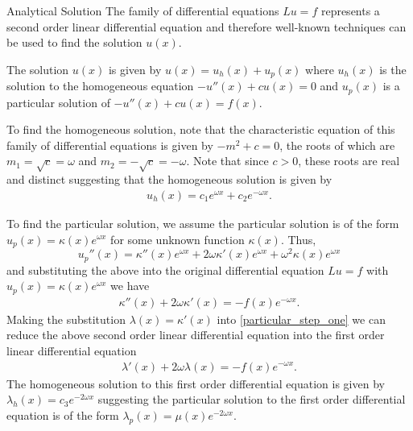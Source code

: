 \documentclass{article}
\begin{document}
\begin{section}{Analytical Solution}
  The family of differential equations $Lu = f$ represents a second order linear
  differential equation and therefore well-known techniques can be used to find
  the solution $u(x)$.

  The solution $u(x)$ is given by $u(x) = u_h(x) + u_p(x)$ where $u_h(x)$ is
  the solution to the homogeneous equation $-u''(x) + c u(x) = 0$ and $u_p(x)$
  is a particular solution of $-u''(x) + c u(x) = f(x)$.

  To find the homogeneous solution, note that the characteristic equation of
  this family of differential equations is given by $-m^2 + c = 0$, the roots of
  which are $m_1 = \sqrt{c} = \omega $ and $m_2 = -\sqrt{c} = -\omega$. Note
  that since $c > 0$, these roots are real and distinct suggesting that the
  homogeneous solution is given by
  \begin{align}\label{homogeneous_solution}
    u_h(x) = c_1 e^{\omega x} + c_2 e^{-\omega x}.
  \end{align}

  To find the particular solution, we assume the particular solution is of the
  form $u_p(x) = \kappa(x) e^{\omega x}$ for some unknown function $\kappa(x)$.
  Thus,
  \[
    u_p''(x) = \kappa''(x) e^{\omega x} + 2 \omega \kappa'(x) e^{\omega x} + \omega^2 \kappa(x) e^{\omega x}
  \]
  and substituting the above into the original differential equation $Lu = f$
  with $u_p(x) = \kappa(x) e^{\omega x}$ we have
  \begin{align}\label{particular_step_one}
    \kappa''(x) + 2\omega\kappa'(x) = -f(x)e^{-\omega x}.
  \end{align}
  Making the substitution $\lambda(x) = \kappa'(x)$ into \eqref{particular_step_one}
  we can reduce the above second order linear differential equation into the
  first order linear differential equation
  \begin{align}\label{particular_step_two}
    \lambda'(x) + 2\omega\lambda(x) = -f(x)e^{-\omega x}.
  \end{align}
  The homogeneous solution to this first order differential equation is given by
  $\lambda_h(x) = c_3 e^{-2\omega x}$ suggesting the particular solution to the
  first order differential equation is of the form $\lambda_p(x) = \mu(x) e^{-2\omega x}$.


\end{section}
\end{document}
